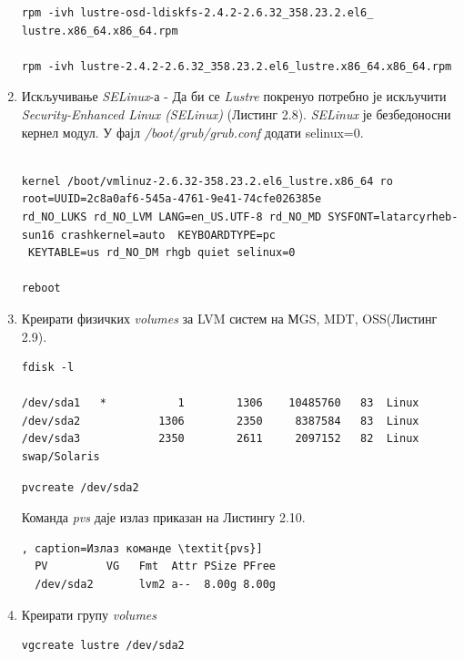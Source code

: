 \begin{enumerate}
\begin{lstlisting}[style=nonumbers,frame=single,caption= Инсталација Net-SNMP-а]
rpm -ivh lustre-osd-ldiskfs-2.4.2-2.6.32_358.23.2.el6_
lustre.x86_64.x86_64.rpm

rpm -ivh lustre-2.4.2-2.6.32_358.23.2.el6_lustre.x86_64.x86_64.rpm
\end{lstlisting}


\item Искључивање \textit{SELinux}-а - 
Да би се   \textit{Lustre} покренуо потребно је искључити \textit{Security-Enhanced Linux (SELinux)} (Листинг 2.8). \textit{SELinux} је безбедоносни кернел модул.
У фајл \textit{/boot/grub/grub.conf} додати selinux=0.

\begin{lstlisting}[style=nonumbers,frame=single,caption= Команде за искључивање \textit{SELinux}-а]

kernel /boot/vmlinuz-2.6.32-358.23.2.el6_lustre.x86_64 ro root=UUID=2c8a0af6-545a-4761-9e41-74cfe026385e 
rd_NO_LUKS rd_NO_LVM LANG=en_US.UTF-8 rd_NO_MD SYSFONT=latarcyrheb-sun16 crashkernel=auto  KEYBOARDTYPE=pc
 KEYTABLE=us rd_NO_DM rhgb quiet selinux=0

reboot 
\end{lstlisting}

\item Креирати физичких \textit{volumes} за LVM систем на МGS, MDT, OSS(Листинг 2.9).
\begin{lstlisting}[style=nonumbers,frame=single, caption=Излаз команде \textit{fdisk -l}]
fdisk -l

/dev/sda1   *           1        1306    10485760   83  Linux
/dev/sda2            1306        2350     8387584   83  Linux
/dev/sda3            2350        2611     2097152   82  Linux swap/Solaris
\end{lstlisting}

\begin{verbatim}
pvcreate /dev/sda2
\end{verbatim}

Команда \textit{pvs} даје излаз приказан на Листингу 2.10.

\begin{lstlisting}[style=nonumbers,frame=single], caption=Излаз команде \textit{pvs}]
  PV         VG   Fmt  Attr PSize PFree
  /dev/sda2       lvm2 a--  8.00g 8.00g
\end{lstlisting}

\item Креирати групу \textit{volumes}

\begin{verbatim}
vgcreate lustre /dev/sda2
\end{verbatim}


\end{enumerate}
